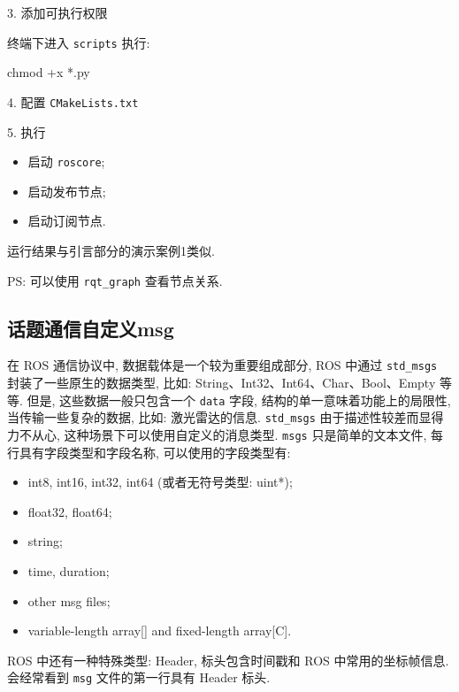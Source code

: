 \documentclass[openany, fontset=windowsold]{ctexbook}
\theoremstyle{kaiti}
\theoremstyle{normal}
\begin{document}
3. 添加可执行权限

终端下进入 \verb|scripts| 执行:

\begin{bash}
  chmod +x *.py
\end{bash}

4. 配置 \verb|CMakeLists.txt|


5. 执行

\begin{itemize}
  \item 启动 \verb|roscore|;
  \item 启动发布节点;
  \item 启动订阅节点.
\end{itemize}

运行结果与引言部分的演示案例1类似.

PS: 可以使用 \verb|rqt_graph| 查看节点关系.

\subsection{话题通信自定义msg}

在 ROS 通信协议中, 数据载体是一个较为重要组成部分, ROS 中通过 \verb|std_msgs| 封装了一些原生的数据类型, 比如: String、Int32、Int64、Char、Bool、Empty 等等. 但是, 这些数据一般只包含一个 \verb|data| 字段, 结构的单一意味着功能上的局限性, 当传输一些复杂的数据, 比如: 激光雷达的信息. \verb|std_msgs| 由于描述性较差而显得力不从心, 这种场景下可以使用自定义的消息类型. \verb|msgs| 只是简单的文本文件, 每行具有字段类型和字段名称, 可以使用的字段类型有: 

\begin{itemize}
  \item int8, int16, int32, int64 (或者无符号类型: uint*);
  \item float32, float64;
  \item string;
  \item time, duration;
  \item other msg files;
  \item variable-length array[] and fixed-length array[C].
\end{itemize}

ROS 中还有一种特殊类型: Header, 标头包含时间戳和 ROS 中常用的坐标帧信息. 会经常看到 \verb|msg| 文件的第一行具有 Header 标头.
\end{document}
